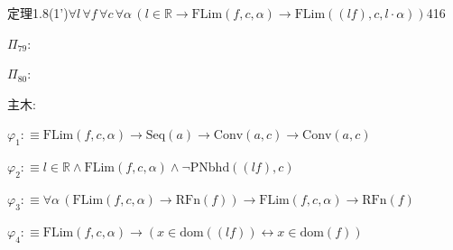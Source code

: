 \begin{fullproof}{定理1.8(1')}{$\forall l\,\forall f\,\forall c\,\forall \alpha\,(l \in \mathbb{R} \to \mathrm{FLim}(f,c,\alpha) \to \mathrm{FLim}((l f),c,l \cdot \alpha))$}{416}
\begin{ptree}
\end{ptree}
\noindent$\Pi_{79}$:
\begin{ptree}
\noLine
{}
\noLine
{}
\end{ptree}
\noindent$\Pi_{80}$:
\begin{ptree}
\noLine
{}
\noLine
{}
\noLine
{}
\end{ptree}
\noindent 主木:
\begin{ptree}
\noLine
{}
\noLine
{}
\noLine
{}
\end{ptree}
\begin{abbrevlist}
\item $\varphi_{1} :\equiv \mathrm{FLim}(f,c,\alpha) \to \mathrm{Seq}(a) \to \mathrm{Conv}(a,c) \to \mathrm{Conv}(a,c)$
\item $\varphi_{2} :\equiv l \in \mathbb{R} \land \mathrm{FLim}(f,c,\alpha) \land \neg \mathrm{PNbhd}((l f),c)$
\item $\varphi_{3} :\equiv \forall \alpha\,(\mathrm{FLim}(f,c,\alpha) \to \mathrm{RFn}(f)) \to \mathrm{FLim}(f,c,\alpha) \to \mathrm{RFn}(f)$
\item $\varphi_{4} :\equiv \mathrm{FLim}(f,c,\alpha) \to (x \in \mathrm{dom}((l f)) \leftrightarrow x \in \mathrm{dom}(f))$

\end{abbrevlist}
\end{fullproof}
